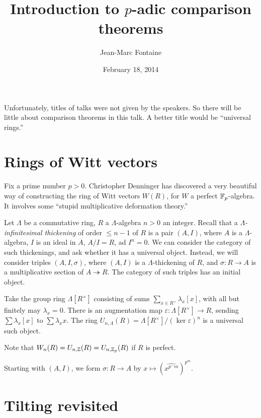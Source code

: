 \documentclass{article}
\title{Introduction to $p$-adic comparison theorems}
\author{Jean-Marc Fontaine}
\date{February 18, 2014}
\begin{document}
\maketitle





Unfortunately, titles of talks were not given by the speakers. So there will 
be little about comparison theorems in this talk. A better title would be 
``universal rings.'' 





\section{Rings of Witt vectors}

Fix a prime number $p>0$. Christopher Denninger has discovered a very beautiful 
way of constructing the ring of Witt vectors $W(R)$, for $W$ a perfect 
$\mathbb{F}_p$-algebra. It involves some ``stupid multiplicative deformation theory.'' 

Let $\Lambda$ be a commutative ring, $R$ a $\Lambda$-algebra $n>0$ an integer. 
Recall that a \emph{$\Lambda$-infinitesimal thickening} of order $\leqslant n-1$ 
of $R$ is a pair $(A,I)$, where $A$ is a $\Lambda$-algebra, $I$ is an ideal in 
$A$, $A/I=R$, ad $I^n=0$. We can consider the category of 
such thickenings, and ask whether it has a universal object. Instead, we will 
consider triples $(A,I,\sigma)$, where $(A,I)$ is a $\Lambda$-thickening of 
$R$, and $\sigma:R\to A$ is a multiplicative section of $A\twoheadrightarrow R$. 
The category of such triples has an initial object. 

Take the group ring 
$\Lambda[R^\times]$ consisting of sums $\sum_{x\in R^\times} \lambda_x [x]$, 
with all but finitely may $\lambda_x=0$. There is an augmentation map 
$\varepsilon:\Lambda[R^\times] \to R$, sending $\sum \lambda_x [x]$ to 
$\sum \lambda_x x$. The ring 
$U_{n,\Lambda}(R) = \Lambda[R^\times]/(\ker\varepsilon)^n$ is a universal 
such object. 

Note that $W_n(R) = U_{n,\mathbb{Z}}(R) = U_{n,\mathbb{Z}_p}(R)$ if $R$ is perfect. 

Starting with $(A,I)$, we form $\sigma:R\to A$ by 
$x\mapsto (\widehat{x^{p^-m}})^{p^m}$. 





\section{Tilting revisited}
\end{document}
